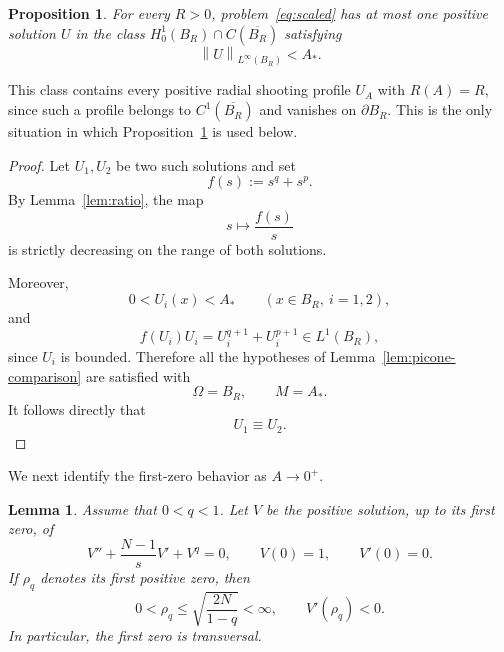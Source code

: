 \documentclass[11pt]{article}
\newcommand{\norm}[1]{\left\|#1\right\|}
\newcommand{\add}[1]{{\color{blue}#1}}
\newcommand{\oldrev}[1]{#1}
\newtheorem{proposition}[theorem]{Proposition}
\newtheorem{lemma}[theorem]{Lemma}
\theoremstyle{definition}
\begin{document}
\begin{proposition}
\label{prop:smalluniqueness}
For every $R>0$, problem~\eqref{eq:scaled} has at most one positive
solution $U$ \add{in the class $H_0^1(B_R)\cap C(\overline{B_R})$}
satisfying
\[
\norm{U}_{L^\infty(B_R)}<A_*.
\]
\end{proposition}

\add{This class contains every positive radial shooting profile
$U_A$ with $R(A)=R$, since such a profile belongs to
$C^1(\overline{B_R})$ and vanishes on $\partial B_R$. This is the only
situation in which Proposition~\ref{prop:smalluniqueness} is used
below.}

\begin{proof}
Let $U_1,U_2$ be two such solutions and set
\[
f(s):=s^q+s^p.
\]
By Lemma~\ref{lem:ratio}, the map
\[
s\longmapsto \frac{f(s)}{s}
\]
is strictly decreasing on the range of both solutions.

\oldrev{
Moreover,
\[
0<U_i(x)<A_*
\qquad
(x\in B_R,\ i=1,2),
\]
and
\[
f(U_i)U_i
=
U_i^{q+1}+U_i^{p+1}\in L^1(B_R),
\]
since $U_i$ is bounded. Therefore all the hypotheses of
Lemma~\ref{lem:picone-comparison} are satisfied with
\[
\Omega=B_R,
\qquad
M=A_*.
\]
It follows directly that
\[
U_1\equiv U_2.
\]
}
\end{proof}





We next identify the first-zero behavior as $A\to0^+$.

\begin{lemma}
\label{lem:rhoq}
\oldrev{Assume that $0<q<1$. Let $V$ be the positive solution,
up to its first zero, of}
\begin{equation}
\label{eq:pureconcave}
V''
+\frac{N-1}{s}V'
+V^q
=0,
\qquad
V(0)=1,
\qquad
V'(0)=0.
\end{equation}
\oldrev{If $\rho_q$ denotes its first positive zero, then}
\[
0<\rho_q\oldrev{\leq
\sqrt{\frac{2N}{1-q}}}<\infty,
\qquad
V'(\rho_q)<0.
\]
\oldrev{In particular, the first zero is transversal.}
\end{lemma}
\end{document}
